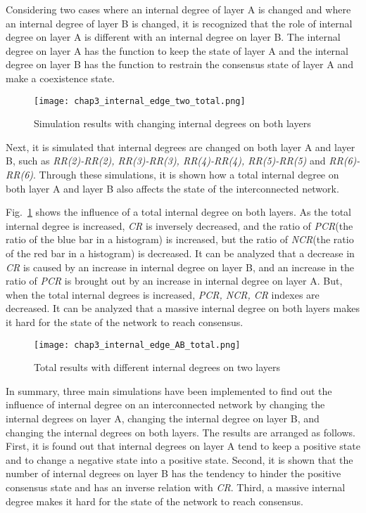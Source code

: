 Considering two cases where an internal degree of layer A is changed and where an internal degree of layer B is changed, it is recognized that the role of internal degree on layer A is different with an internal degree on layer B. The internal degree on layer A has the function to keep the state of layer A and the internal degree on layer B has the function to restrain the consensus state of layer A and make a coexistence state. 

\begin{figure}[!htb]
	\centering
	\texttt{[image: chap3\_internal\_edge\_two\_total.png]}
	\caption{Simulation results with changing internal degrees on both layers}
	\label{chap3_internal_edge_two_total}
\end{figure}

Next, it is simulated that internal degrees are changed on both layer A and layer B, such as \textit{RR(2)-RR(2), RR(3)-RR(3), RR(4)-RR(4), RR(5)-RR(5)} and \textit{RR(6)-RR(6)}. Through these simulations, it is shown how a total internal degree on both layer A and layer B also affects the state of the interconnected network.

Fig.~\ref{chap3_internal_edge_two_total} shows the influence of a total internal degree on both layers. As the total internal degree is increased, \textit{CR} is inversely decreased, and the ratio of \textit{PCR}(the ratio of the blue bar in a histogram) is increased, but the ratio of \textit{NCR}(the ratio of the red bar in a histogram) is decreased. It can be analyzed that a decrease in \textit{CR} is caused by an increase in internal degree on layer B, and an increase in the ratio of \textit{PCR} is brought out by an increase in internal degree on layer A. But, when the total internal degrees is increased, \textit{PCR, NCR, CR} indexes are decreased. It can be analyzed that a massive internal degree on both layers makes it hard for the state of the network to reach consensus. 
\begin{figure}[!htb]
	\centering
	\texttt{[image: chap3\_internal\_edge\_AB\_total.png]}
	\caption{Total results with different internal degrees on two layers}
	\label{chap3_internal_edge_AB_total}
\end{figure}

In summary, three main simulations have been implemented to find out the influence of internal degree on an interconnected network by changing the internal degrees on layer A, changing the internal degree on layer B, and changing the internal degrees on both layers. The results are arranged as follows. First, it is found out that internal degrees on layer A tend to keep a positive state and to change a negative state into a positive state. Second,  it is shown that the number of internal degrees on layer B has the tendency to hinder the positive consensus state and has an inverse relation with \textit{CR}. Third, a massive internal degree makes it hard for the state of the network to reach consensus. 

